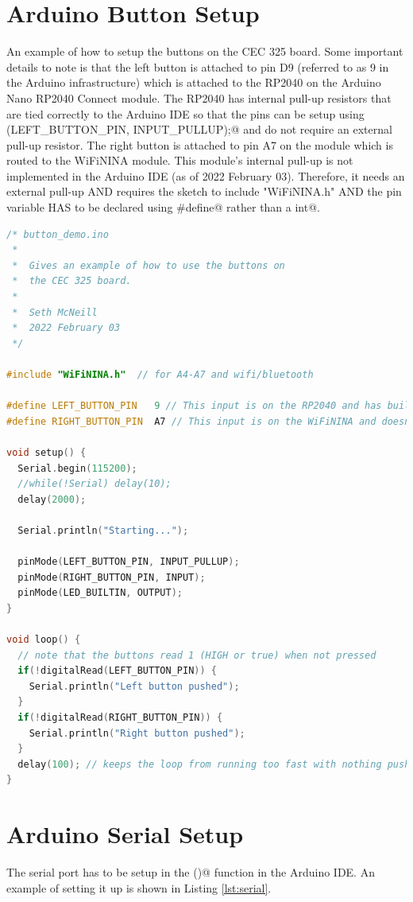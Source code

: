 \section{Arduino Button Setup}
An example of how to setup the buttons on the CEC 325 board. Some important details to note is that the left button 
is attached to pin D9 (referred to as 9 in the Arduino infrastructure) which is attached to the RP2040 on the
Arduino Nano RP2040 Connect module. The RP2040 has internal pull-up resistors that are tied correctly to the 
Arduino IDE so that the pins can be setup using \lstinline@pinMode(LEFT_BUTTON_PIN, INPUT_PULLUP);@ and do not
require an external pull-up resistor. The right button is attached to pin A7 on the module which is routed to the
WiFiNINA module. This module's internal pull-up is not implemented in the Arduino IDE (as of 2022 February 03). 
Therefore, it needs an external pull-up AND requires the sketch to include "WiFiNINA.h" AND the pin variable 
HAS to be declared using \lstinline@#define@ rather than a \lstinline@const int@.

\begin{lstlisting}[language=C++, caption={This is an example of how to setup the buttons on the CEC 325 board.},label={lst:buttons}]
/* button_demo.ino
 *  
 *  Gives an example of how to use the buttons on 
 *  the CEC 325 board.
 *  
 *  Seth McNeill
 *  2022 February 03
 */

#include "WiFiNINA.h"  // for A4-A7 and wifi/bluetooth

#define LEFT_BUTTON_PIN   9 // This input is on the RP2040 and has builtin pullup that works
#define RIGHT_BUTTON_PIN  A7 // This input is on the WiFiNINA and doesn't have working internal pullup

void setup() {
  Serial.begin(115200);
  //while(!Serial) delay(10);
  delay(2000);

  Serial.println("Starting...");

  pinMode(LEFT_BUTTON_PIN, INPUT_PULLUP);
  pinMode(RIGHT_BUTTON_PIN, INPUT);
  pinMode(LED_BUILTIN, OUTPUT);
}

void loop() {
  // note that the buttons read 1 (HIGH or true) when not pressed
  if(!digitalRead(LEFT_BUTTON_PIN)) {
    Serial.println("Left button pushed");
  }
  if(!digitalRead(RIGHT_BUTTON_PIN)) {
    Serial.println("Right button pushed");
  }
  delay(100); // keeps the loop from running too fast with nothing pushed
}
\end{lstlisting}

\section{Arduino Serial Setup}
The serial port has to be setup in the \lstinline@setup()@ function in the Arduino IDE. An example of setting it up 
is shown in Listing \ref{lst:serial}.

